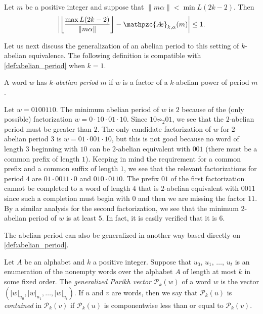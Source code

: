 \documentclass[a4paper,fleqn]{article}
\providecommand{\abs}[1]{\lvert#1\rvert}
\providecommand{\Abs}[1]{\left\lvert#1\right\rvert}
\providecommand{\norm}[1]{\lVert#1\rVert}
\providecommand{\Floor}[1]{\left\lfloor#1\right\rfloor}
\newcommand{\Parikh}[2][]{\mathcal{P}_{#1}(#2)}
\newcommand{\abexp}[2][]{\mathpzc{A\mkern-3mu e}_{#1}(#2)}
\begin{document}
  \begin{proposition}\cite[Lemma~3.10]{2018:on_k-abelian_equivalence_and_generalized_lagrange_spectra}
    Let $m$ be a positive integer and suppose that $\norm{m\alpha} < \min L(2k-2)$. Then
    \begin{equation*}
      \Abs{\Floor{\frac{\max L(2k-2)}{\norm{m\alpha}}} - \abexp[k,\alpha]{m}} \leq 1.
    \end{equation*}
  \end{proposition}

  Let us next discuss the generalization of an abelian period to this setting of $k$-abelian equivalence. The following
  definition is compatible with \autoref{def:abelian_period} when $k = 1$.

  \begin{definition}
    A word $w$ has \emph{$k$-abelian period} $m$ if $w$ is a factor of a $k$-abelian power of period $m$.
  \end{definition}

  \begin{example}\label{ex:k-ab_example}
    Let $w = 0100110$. The minimum abelian period of $w$ is $2$ because of the (only possible) factorization
    $w = 0 \cdot 10 \cdot 01 \cdot 10$. Since $10 \not\sim_2 01$, we see that the $2$-abelian period must be greater
    than $2$. The only candidate factorization of $w$ for $2$-abelian period $3$ is $w = 01 \cdot 001 \cdot 10$, but
    this is not good because no word of length $3$ beginning with $10$ can be $2$-abelian equivalent with $001$ (there
    must be a common prefix of length $1$). Keeping in mind the requirement for a common prefix and a common suffix of
    length $1$, we see that the relevant factorizations for period $4$ are $01 \cdot 0011 \cdot 0$ and
    $010 \cdot 0110$. The prefix $01$ of the first factorization cannot be completed to a word of length $4$ that is
    $2$-abelian equivalent with $0011$ since such a completion must begin with $0$ and then we are missing the factor
    $11$. By a similar analysis for the second factorization, we see that the minimum $2$-abelian period of $w$ is at
    least $5$. In fact, it is easily verified that it is $6$.
  \end{example}

  The abelian period can also be generalized in another way based directly on \autoref{def:abelian_period}.

  \begin{definition}
    Let $A$ be an alphabet and $k$ a positive integer. Suppose that $u_0$, $u_1$, $\ldots$, $u_t$ is an enumeration of
    the nonempty words over the alphabet $A$ of length at most $k$ in some fixed order. The \emph{generalized Parikh
    vector} $\Parikh[k]{w}$ of a word $w$ is the vector $(\abs{w}_{u_0}, \abs{w}_{u_1}, \ldots, \abs{w}_{u_t})$. If
    $u$ and $v$ are words, then we say that $\Parikh[k]{u}$ is \emph{contained} in $\Parikh[k]{v}$ if $\Parikh[k]{u}$
    is componentwise less than or equal to $\Parikh[k]{v}$.
  \end{definition}
\end{document}
